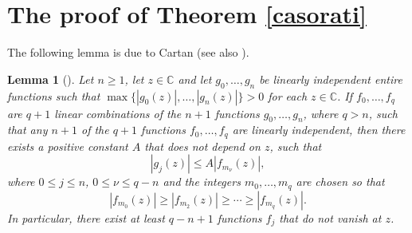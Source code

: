 \documentclass{amsart}
\newcommand{\C}{\mathbb{C}}
\newtheorem{lemma}[theorem]{Lemma}
\theoremstyle{definition}
\numberwithin{equation}{section}
\numberwithin{theorem}{section}
\begin{document}
\section{The proof of Theorem \ref{casorati}}\label{section_proof}

The following lemma is due to Cartan \cite{cartan:33} (see also
\cite{gundersenh:04}).

\begin{lemma}[\cite{cartan:33}]\label{cartanlemma}
Let $n\geq 1$, let $z\in\C$ and let $g_0,\ldots,g_n$ be linearly
independent entire functions such that
$\max\{|g_0(z)|,\ldots,|g_n(z)|\}>0$ for each $z\in\C$. If
$f_0,\ldots,f_q$ are $q+1$ linear combinations of the $n+1$
functions $g_0,\ldots,g_n$, where $q>n$, such that any $n+1$ of
the $q+1$ functions $f_0,\ldots,f_q$ are linearly independent,
then there exists a positive constant $A$ that does not depend on
$z$, such that
    \begin{equation*}
    |g_j(z)|\leq A|f_{m_\nu}(z)|,
    \end{equation*}
where $0\leq j \leq n$, $0\leq\nu\leq q-n$ and the integers
$m_0,\ldots,m_q$ are chosen so that
    \begin{equation*}
    |f_{m_0}(z)|\geq |f_{m_2}(z)|\geq \cdots \geq |f_{m_q}(z)|.
    \end{equation*}
In particular, there exist at least $q-n+1$ functions $f_j$ that
do not vanish at $z$.
\end{lemma}
\end{document}
